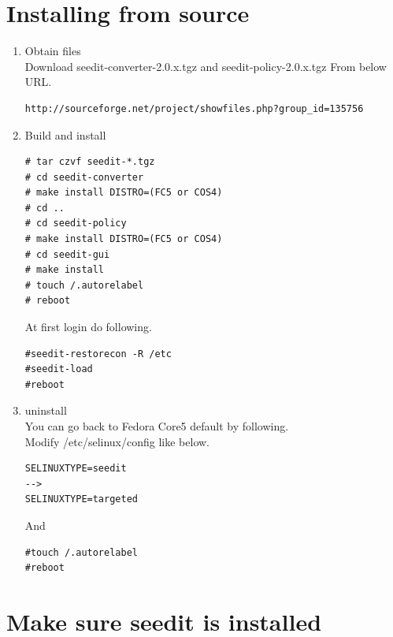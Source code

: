 \documentclass{article}
\begin{document}
\section{Installing from source}
\begin{enumerate}
 \item Obtain files\\
Download seedit-converter-2.0.x.tgz and seedit-policy-2.0.x.tgz
From below URL.
\begin{verbatim}
http://sourceforge.net/project/showfiles.php?group_id=135756	
\end{verbatim}
 \item Build and install\\
\begin{verbatim}
# tar czvf seedit-*.tgz
# cd seedit-converter
# make install DISTRO=(FC5 or COS4)
# cd .. 
# cd seedit-policy
# make install DISTRO=(FC5 or COS4)
# cd seedit-gui
# make install
# touch /.autorelabel
# reboot
\end{verbatim}

At first login do following.
\begin{verbatim}
#seedit-restorecon -R /etc
#seedit-load 
#reboot	
\end{verbatim}


 \item uninstall\\
You can go back to Fedora Core5 default by following.\\
Modify /etc/selinux/config like below.
\begin{verbatim}
SELINUXTYPE=seedit
-->
SELINUXTYPE=targeted
\end{verbatim}
And 
\begin{verbatim}
#touch /.autorelabel
#reboot	
\end{verbatim}


\end{enumerate}



\section{Make sure seedit is installed}\label{sec:makesure}
\end{document}
